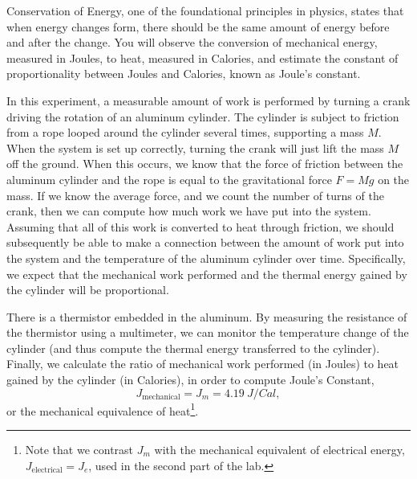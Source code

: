 \documentclass[addpoints]{physlabs}
\begin{document}
\begin{labsection}

\begin{objective}
    Conservation of Energy, one of the foundational principles in physics, states that when energy changes form, there should be the same amount of energy before and after the change. You will observe the conversion of mechanical energy, measured in Joules, to heat, measured in Calories, and estimate the constant of proportionality between Joules and Calories, known as Joule's constant.
\end{objective}

\begin{theory}
    In this experiment, a measurable amount of work is performed by turning a crank driving the rotation of an aluminum cylinder. The cylinder is subject to friction from a rope looped around the cylinder several times, supporting a mass $M$. When the system is set up correctly, turning the crank will just lift the mass $M$ off the ground. When this occurs, we know that the force of friction between the aluminum cylinder and the rope is equal to the gravitational force $F=Mg$ on the mass. If we know the average force, and we count the number of turns of the crank, then we can compute how much work we have put into the system. Assuming that all of this work is converted to heat through friction, we should subsequently be able to make a connection between the amount of work put into the system and the temperature of the aluminum cylinder over time. Specifically, we expect that the mechanical work performed and the thermal energy gained by the cylinder will be proportional.

    There is a thermistor embedded in the aluminum. By measuring the resistance of the thermistor using a multimeter, we can monitor the temperature change of the cylinder (and thus compute the thermal energy transferred to the cylinder). Finally, we calculate the ratio of mechanical work performed (in Joules) to heat gained by the cylinder (in Calories), in order to compute Joule's Constant,
    \begin{equation}\label{eq: joule's constant theory}
        J_\text{mechanical} = J_m = \qty{4.19}{J/Cal},
    \end{equation}
    or the mechanical equivalence of heat\footnote{Note that we contrast $J_m$ with the mechanical equivalent of electrical energy, $J_\text{electrical}=J_e$, used in the second part of the lab.}.


\end{theory}
\end{labsection}
\end{document}

